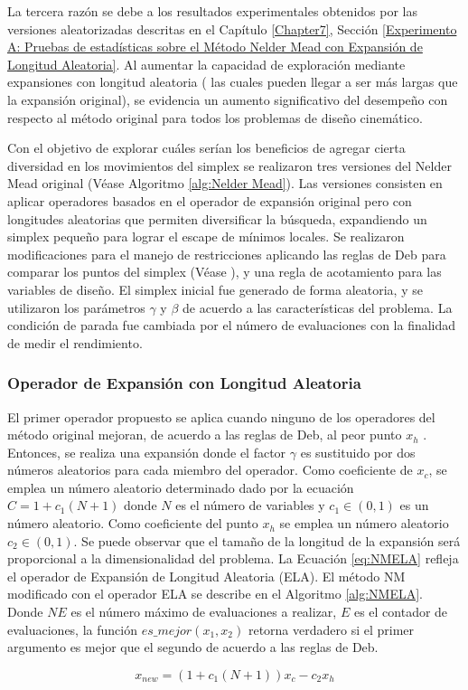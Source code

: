 La tercera razón se debe a los resultados experimentales obtenidos por las versiones aleatorizadas descritas en el Capítulo \ref{Chapter7}, Sección \ref{Experimento A: Pruebas de estadísticas sobre el Método Nelder Mead con Expansión de Longitud Aleatoria}. Al aumentar la capacidad de exploración mediante expansiones con longitud aleatoria ( las cuales pueden llegar a ser más largas que la expansión original), se evidencia un aumento significativo del desempeño con respecto al método original para todos los problemas de diseño cinemático.

Con el objetivo de explorar cuáles serían los beneficios de agregar cierta diversidad en los movimientos del simplex se realizaron tres versiones del Nelder Mead original (Véase Algoritmo \ref{alg:Nelder Mead}). Las versiones consisten en aplicar operadores basados en el operador de expansión original pero con longitudes aleatorias que permiten diversificar la búsqueda, expandiendo un simplex pequeño para lograr el escape de mínimos locales. Se realizaron modificaciones para el manejo de restricciones aplicando las reglas de Deb para comparar los puntos del simplex (Véase \cite{deb_efficient_1998}), y una regla de acotamiento para las variables de diseño. El simplex inicial fue generado de forma aleatoria, y se utilizaron los parámetros  $\gamma$ y $\beta$ de acuerdo a las características del problema. La condición de parada fue cambiada por el número de evaluaciones con la finalidad de medir el rendimiento. 

\subsubsection{Operador de Expansión con Longitud Aleatoria}

El primer operador propuesto se aplica cuando ninguno de los operadores del método original mejoran, de acuerdo a las reglas de Deb, al peor punto $x_h$ . Entonces, se realiza una expansión  donde el factor $\gamma$ es sustituido por dos números aleatorios para cada miembro del operador. Como coeficiente de   $x_c$, se emplea un número aleatorio determinado dado por la ecuación $C =1+c_1(N+1)$ donde $N$ es el número de variables y $c_1 \in (0,1)$ es un número aleatorio. Como coeficiente del punto $x_h$ se emplea un número aleatorio $c_2 \in (0,1)$. Se puede observar que el tamaño de la longitud de la expansión será proporcional a la dimensionalidad del problema. La Ecuación \ref{eq:NMELA} refleja el operador de Expansión de Longitud Aleatoria (ELA). El método NM modificado con el operador ELA se describe en el Algoritmo \ref{alg:NMELA}. Donde $NE$ es el número máximo de evaluaciones a realizar, $E$ es el contador de evaluaciones, la función $es\_mejor(x_1,x_2)$  retorna verdadero si el primer argumento es mejor que el segundo de acuerdo a las reglas de Deb.
\begin{center}
\begin{equation}\label{eq:NMELA}
x_{new}=(1+c_1(N+1))x_c-c_2 x_h
\end{equation}
\end{center}

